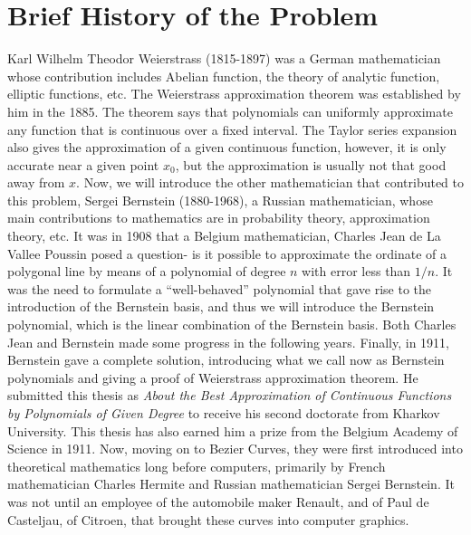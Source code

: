 \documentclass{article}
\begin{document}
\section{Brief History of the Problem}\label{sec:hist}
Karl Wilhelm Theodor Weierstrass (1815-1897) was a German mathematician whose contribution includes Abelian function, the theory of analytic function, elliptic functions, etc.
The Weierstrass approximation theorem was established by him in the 1885. 
The theorem says that polynomials can uniformly approximate any function that is continuous over a fixed interval.
The Taylor series expansion also gives the approximation of a given continuous function, however, it is only accurate near a given point $x_0$, but the approximation is usually not that good away from $x$.
Now, we will introduce the other mathematician that contributed to this problem, Sergei Bernstein (1880-1968), a Russian mathematician, whose main contributions to mathematics are in probability theory, approximation theory, etc. 
It was in 1908 that a Belgium mathematician, Charles Jean de La Vallee Poussin posed a question- is it possible to approximate the ordinate of a polygonal line by means of a polynomial of degree $n$ with error less than $1/n$.
It was the need to formulate a ``well-behaved'' polynomial that gave rise to the introduction of the Bernstein basis, and thus we will introduce the Bernstein polynomial, which is the linear combination of the Bernstein basis.
Both Charles Jean and Bernstein made some progress in the following years.
Finally, in 1911, Bernstein gave a complete solution, introducing what we call now as Bernstein polynomials and giving a proof of Weierstrass approximation theorem.
He submitted this thesis as \textit{About the Best Approximation of Continuous Functions by Polynomials of Given Degree} to receive his second doctorate from Kharkov University.
This thesis has also earned him a prize from the Belgium Academy of Science in 1911.\cite{o'connor_robertson_2010}
Now, moving on to Bezier Curves, they were first introduced into theoretical mathematics long before computers, primarily by French mathematician Charles Hermite and Russian mathematician Sergei Bernstein.
It was not until an employee of the automobile maker Renault, and of Paul de Casteljau, of Citroen, that brought these curves into computer graphics.\cite{farouki2012bernstein}
\end{document}

